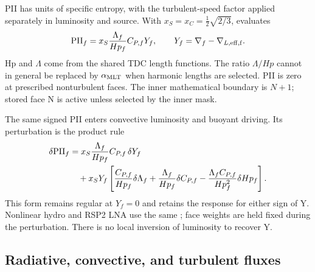 \documentclass[11pt]{article}
\newenvironment{equationblock}{%
  \par\noindent\begin{minipage}{\linewidth}%
}{\end{minipage}\par\addvspace{12pt}}
\newcommand{\code}[1]{\texttt{\detokenize{#1}}}
\begin{document}
\begin{equationblock}
PII has units of specific entropy, with the turbulent-speed factor applied
separately in luminosity and source. With $x_S=x_C=\tfrac12\sqrt{2/3}$,
 evaluates
\begin{equation}
 \mathrm{PII}_f=x_S\frac{\Lambda_f}{Hp_f}C_{P,f}Y_f,
 \qquad Y_f=\nabla_f-\nabla_{L,\rm eff,f}.
 \label{eq:pii}
\end{equation}
Hp and $\Lambda$ come from the shared TDC length functions. The ratio
$\Lambda/Hp$ cannot in general be replaced by $\alpha_{\rm MLT}$ when
harmonic lengths are selected. PII is zero at prescribed nonturbulent faces. The inner mathematical
boundary is $N+1$; stored face N is active unless selected by the inner mask.

The same signed PII enters convective luminosity and buoyant driving.
Its perturbation is the product rule
\begin{align}
 \delta\mathrm{PII}_f
 &=x_S\frac{\Lambda_f}{Hp_f}C_{P,f}\,\delta Y_f\notag\\
 &\quad+x_SY_f\left[
   \frac{C_{P,f}}{Hp_f}\delta\Lambda_f
   +\frac{\Lambda_f}{Hp_f}\delta C_{P,f}
   -\frac{\Lambda_f C_{P,f}}{Hp_f^2}\delta Hp_f\right].
\end{align}
This form remains regular at $Y_f=0$ and retains the response for either
sign of Y. Nonlinear hydro and RSP2 LNA use the same \code{PII_ad}; face
weights are held fixed during the perturbation. There is no local inversion
of luminosity to recover Y.
\end{equationblock}

\subsection{Radiative, convective, and turbulent fluxes}
\end{document}
